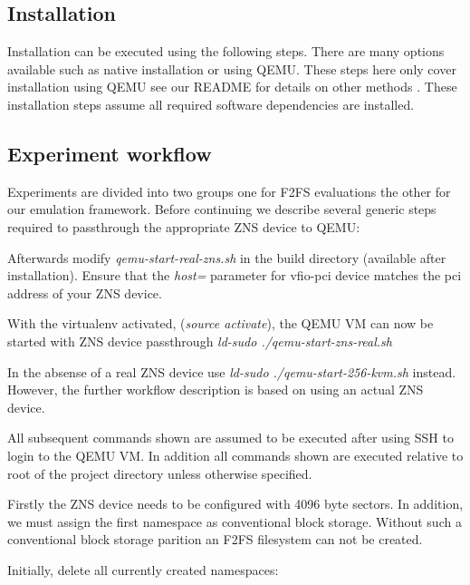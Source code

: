 \subsection{Installation}

Installation can be executed using the following steps. There are many options
available such as native installation or using QEMU. These steps here only
cover installation using QEMU see our README for details on other methods
\cite{qemu-csd}. These installation steps assume all required software
dependencies are installed.


\subsection{Experiment workflow}

Experiments are divided into two groups one for F2FS evaluations the other for
our emulation framework. Before continuing we describe several generic steps
required to passthrough the appropriate ZNS device to QEMU:


Afterwards modify \textit{qemu-start-real-zns.sh} in the build directory
(available after installation). Ensure that the \textit{host=} parameter for
vfio-pci device matches the pci address of your ZNS device.

With the virtualenv activated, (\textit{source activate}), the QEMU VM can now
be started with ZNS device passthrough \textit{ld-sudo ./qemu-start-zns-real.sh}

In the absense of a real ZNS device use \textit{ld-sudo ./qemu-start-256-kvm.sh}
instead. However, the further workflow description is based on using an actual
ZNS device.

All subsequent commands shown are assumed to be executed after using SSH to
login to the QEMU VM. In addition all commands shown are executed relative
to root of the project directory unless otherwise specified.

Firstly the ZNS device needs to be configured with 4096 byte sectors. In
addition, we must assign the first namespace as conventional block storage.
Without such a conventional block storage parition an F2FS filesystem can not
be created.

Initially, delete all currently created namespaces:


